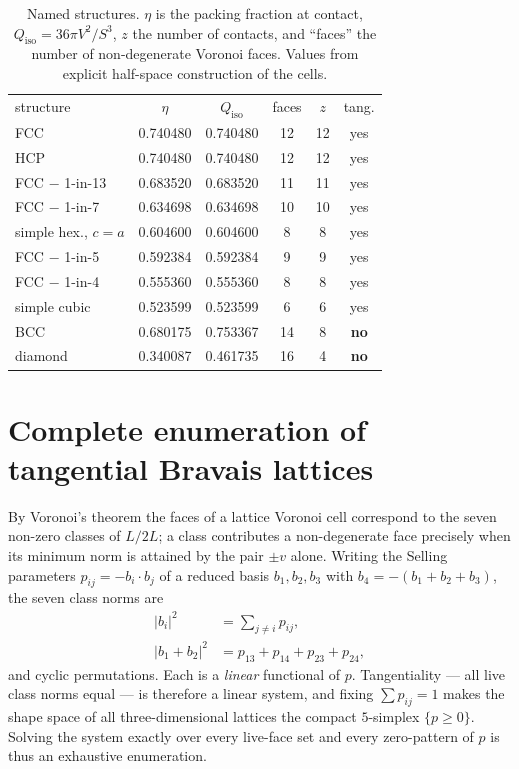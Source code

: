 \documentclass[aps,prl,twocolumn,superscriptaddress,floatfix]{revtex4-2}
\begin{document}
\begin{table}[t]
\caption{Named structures. $\eta$ is the packing fraction at contact,
$Q_{\mathrm{iso}}=36\pi V^2/S^3$, $z$ the number of contacts, and ``faces'' the
number of non-degenerate Voronoi faces. Values from explicit half-space
construction of the cells.}
\label{tab:named}
\begin{ruledtabular}
\begin{tabular}{lccccc}
structure & $\eta$ & $Q_{\mathrm{iso}}$ & faces & $z$ & tang.\\
\colrule
FCC & 0.740480 & 0.740480 & 12 & 12 & yes\\
HCP & 0.740480 & 0.740480 & 12 & 12 & yes\\
FCC $-$ 1-in-13 & 0.683520 & 0.683520 & 11 & 11 & yes\\
FCC $-$ 1-in-7  & 0.634698 & 0.634698 & 10 & 10 & yes\\
simple hex., $c=a$ & 0.604600 & 0.604600 & 8 & 8 & yes\\
FCC $-$ 1-in-5  & 0.592384 & 0.592384 & 9 & 9 & yes\\
FCC $-$ 1-in-4  & 0.555360 & 0.555360 & 8 & 8 & yes\\
simple cubic & 0.523599 & 0.523599 & 6 & 6 & yes\\
BCC & 0.680175 & 0.753367 & 14 & 8 & \textbf{no}\\
diamond & 0.340087 & 0.461735 & 16 & 4 & \textbf{no}\\
\end{tabular}
\end{ruledtabular}
\end{table}

\section{Complete enumeration of tangential Bravais lattices}
\label{sec:enum}

By Voronoi's theorem the faces of a lattice Voronoi cell correspond to the seven
non-zero classes of $L/2L$; a class contributes a non-degenerate face precisely
when its minimum norm is attained by the pair $\pm v$ alone. Writing the Selling
parameters $p_{ij}=-b_i\cdot b_j$ of a reduced basis $b_1,b_2,b_3$ with
$b_4=-(b_1+b_2+b_3)$, the seven class norms are
\begin{align}
|b_i|^2 &= \textstyle\sum_{j\neq i} p_{ij},\\
|b_1+b_2|^2 &= p_{13}+p_{14}+p_{23}+p_{24},
\end{align}
and cyclic permutations. Each is a \emph{linear} functional of $p$. Tangentiality
--- all live class norms equal --- is therefore a linear system, and fixing
$\sum p_{ij}=1$ makes the shape space of all three-dimensional lattices the
compact $5$-simplex $\{p\geq0\}$. Solving the system exactly over every live-face
set and every zero-pattern of $p$ is thus an exhaustive enumeration.
\end{document}

